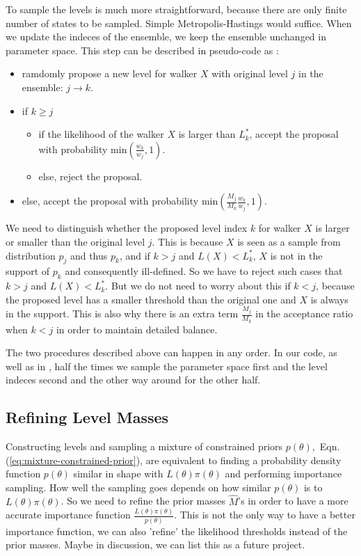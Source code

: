 \documentclass[letterpaper, preprint]{aastex}
\newcommand{\qer}[1]{{\color{red}#1}}
\begin{document}
To sample the levels is much more straightforward, because there are only finite number of states to be sampled. Simple Metropolis-Hastings would suffice. When we update the indeces of the ensemble, we keep the ensemble unchanged in parameter space. This step can be described in pseudo-code as \citep{brewer11a}:\newpage
\begin{sffamily}
\begin{itemize}
\item ramdomly propose a new level for walker $X$ with original level $j$ in the ensemble: $j \rightarrow k$.
\item if $k \geq j$
\begin{itemize}
\item if the likelihood of the walker $X$ is larger than $L^*_k$, accept the proposal with probability $\mathrm{min}\left(\frac{w_k}{w_j},1\right)$.
\item else, reject the proposal.
\end{itemize}
\item else, accept the proposal with probability $\mathrm{min}\left(\frac{M_j}{M_k}\frac{w_k}{w_j},1\right)$.
\end{itemize}
\end{sffamily}
We need to distinguish whether the proposed level index $k$ for walker $X$ is larger or smaller than the original level $j$. This is because $X$ is seen as a sample from distribution $p_j$ and thus $p_k$, and if $k>j$ and $L(X) < L^*_k$, $X$ is not in the support of $p_k$ and consequently ill-defined. So we have to reject such cases that $k>j$ and $L(X) < L^*_k$. But we do not need to worry about this if $k<j$, because the proposed level has a smaller threshold than the original one and $X$ is always in the support. This is also why there is an extra term $\frac{M_j}{M_k}$ in the acceptance ratio when $k<j$ in order to maintain detailed balance.

The two procedures described above can happen in any order. In our code, as well as in \citep{brewer11a}, half the times we sample the parameter space first and the level indeces second and the other way around for the other half.

\subsection{Refining Level Masses}
\label{sec:refining-level-masses}
Constructing levels and sampling a mixture of constrained priors $p(\theta),$ Eqn. (\ref{eq:mixture-constrained-prior}), are equivalent to finding a probability density function $p(\theta)$ similar in shape with $L(\theta)\pi(\theta)$ and performing importance sampling. How well the sampling goes depends on how similar $p(\theta)$ is to $L(\theta)\pi(\theta)$. So we need to refine the prior masses $\widehat{M}$'s in order to have a more accurate importance function $\frac{L(\theta)\pi(\theta)}{p(\theta)}$. This is not the only way to have a better importance function, we can also 'refine' the likelihood thresholds instead of the prior masses. 
\qer{Maybe in discussion, we can list this as a future project.}
\end{document}
